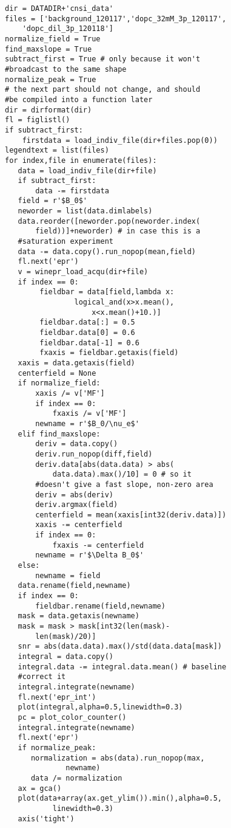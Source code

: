 {\begin{tiny}
\begin{lstlisting}
dir = DATADIR+'cnsi_data'
files = ['background_120117','dopc_32mM_3p_120117',
    'dopc_dil_3p_120118']
normalize_field = True
find_maxslope = True
subtract_first = True # only because it won't
#broadcast to the same shape
normalize_peak = True
# the next part should not change, and should
#be compiled into a function later
dir = dirformat(dir)
fl = figlistl()
if subtract_first:
    firstdata = load_indiv_file(dir+files.pop(0))
legendtext = list(files)
for index,file in enumerate(files):
   data = load_indiv_file(dir+file)
   if subtract_first:
       data -= firstdata
   field = r'$B_0$'
   neworder = list(data.dimlabels)
   data.reorder([neworder.pop(neworder.index(
       field))]+neworder) # in case this is a
   #saturation experiment
   data -= data.copy().run_nopop(mean,field)
   fl.next('epr')
   v = winepr_load_acqu(dir+file)
   if index == 0:
        fieldbar = data[field,lambda x:
                logical_and(x>x.mean(),
                    x<x.mean()+10.)]
        fieldbar.data[:] = 0.5
        fieldbar.data[0] = 0.6
        fieldbar.data[-1] = 0.6
        fxaxis = fieldbar.getaxis(field)
   xaxis = data.getaxis(field)
   centerfield = None
   if normalize_field:
       xaxis /= v['MF']
       if index == 0:
           fxaxis /= v['MF']
       newname = r'$B_0/\nu_e$'
   elif find_maxslope:
       deriv = data.copy()
       deriv.run_nopop(diff,field)
       deriv.data[abs(data.data) > abs(
           data.data).max()/10] = 0 # so it
       #doesn't give a fast slope, non-zero area
       deriv = abs(deriv)
       deriv.argmax(field)
       centerfield = mean(xaxis[int32(deriv.data)])
       xaxis -= centerfield
       if index == 0:
           fxaxis -= centerfield
       newname = r'$\Delta B_0$'
   else:
       newname = field
   data.rename(field,newname)
   if index == 0:
       fieldbar.rename(field,newname)
   mask = data.getaxis(newname)
   mask = mask > mask[int32(len(mask)-
       len(mask)/20)]
   snr = abs(data.data).max()/std(data.data[mask])
   integral = data.copy()
   integral.data -= integral.data.mean() # baseline
   #correct it
   integral.integrate(newname)
   fl.next('epr_int')
   plot(integral,alpha=0.5,linewidth=0.3)
   pc = plot_color_counter()
   integral.integrate(newname)
   fl.next('epr')
   if normalize_peak:
      normalization = abs(data).run_nopop(max,
              newname)
      data /= normalization
   ax = gca()
   plot(data+array(ax.get_ylim()).min(),alpha=0.5,
           linewidth=0.3)
   axis('tight')

\end{lstlisting}
\end{tiny}}
